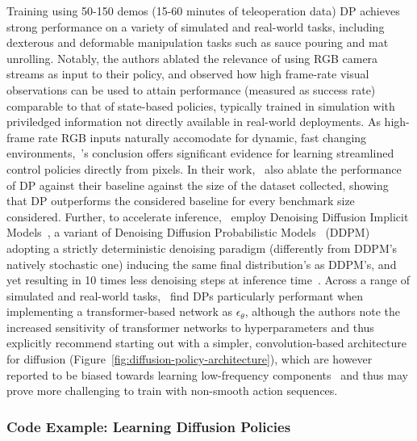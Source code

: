 Training using 50-150 demos (15-60 minutes of teleoperation data) DP achieves strong performance on a variety of simulated and real-world tasks, including dexterous and deformable manipulation tasks such as sauce pouring and mat unrolling.
Notably, the authors ablated the relevance of using RGB camera streams as input to their policy, and observed how high frame-rate visual observations can be used to attain performance (measured as success rate) comparable to that of state-based policies, typically trained in simulation with priviledged information not directly available in real-world deployments.
As high-frame rate RGB inputs naturally accomodate for dynamic, fast changing environments,~\citet{chiDiffusionPolicyVisuomotor2024}'s conclusion offers significant evidence for learning streamlined control policies directly from pixels.
In their work,~\citet{chiDiffusionPolicyVisuomotor2024} also ablate the performance of DP against their baseline against the size of the dataset collected, showing that DP outperforms the considered baseline for every benchmark size considered.
Further, to accelerate inference,~\citet{chiDiffusionPolicyVisuomotor2024} employ Denoising Diffusion Implicit Models~\citep{songDenoisingDiffusionImplicit2022}, a variant of Denoising Diffusion Probabilistic Models~\citep{hoDenoisingDiffusionProbabilistic2020} (DDPM) adopting a strictly deterministic denoising paradigm (differently from DDPM's natively stochastic one) inducing the same final distribution's as DDPM's, and yet resulting in 10 times less denoising steps at inference time~\citep{chiDiffusionPolicyVisuomotor2024}.
Across a range of simulated and real-world tasks,~\citet{chiDiffusionPolicyVisuomotor2024} find DPs particularly performant when implementing a transformer-based network as \( \epsilon_\theta \), although the authors note the increased sensitivity of transformer networks to hyperparameters and thus explicitly recommend starting out with a simpler, convolution-based architecture for diffusion (Figure~\ref{fig:diffusion-policy-architecture}), which are however reported to be biased towards learning low-frequency components~\citep{tancikFourierFeaturesLet2020} and thus may prove more challenging to train with non-smooth action sequences.


\subsubsection{Code Example: Learning Diffusion Policies}

